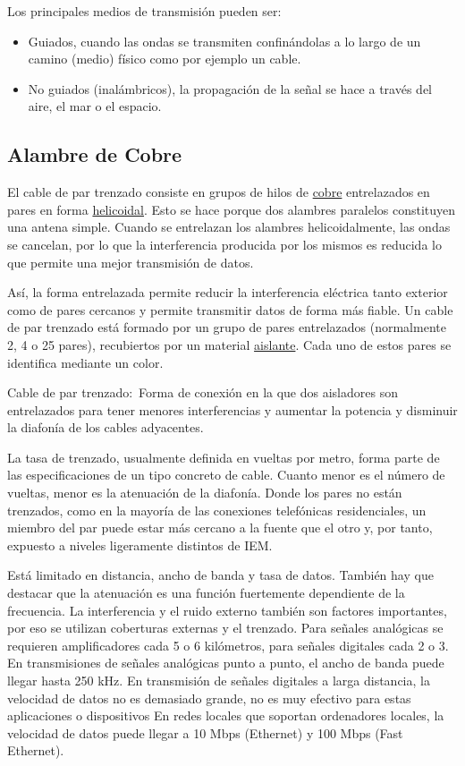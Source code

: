 \documentclass[a4paper]{article}
\begin{document}
Los principales medios de transmisión pueden ser:

\begin{itemize}
  \item Guiados, cuando las ondas se transmiten confinándolas a lo largo de un
  camino (medio) físico como por ejemplo un cable.
  
  \item No guiados (inalámbricos), la propagación de la señal se hace a través
  del aire, el mar o el espacio.  
\end{itemize}


\subsection{Alambre de Cobre}
El cable de par trenzado consiste en grupos de hilos
de \href{https://es.wikipedia.org/wiki/Cobre}{cobre} entrelazados en pares en forma \href{https://es.wikipedia.org/wiki/H\%C3\%A9lice_(geometr\%C3\%ADa)}{helicoidal}.
Esto se hace porque dos alambres paralelos constituyen una antena simple. Cuando se entrelazan los alambres helicoidalmente, las ondas se cancelan, por lo que la interferencia producida por los mismos es reducida lo que permite una mejor transmisión de datos.

Así, la forma entrelazada permite reducir la interferencia eléctrica
tanto exterior como de pares cercanos y permite transmitir datos de
forma más fiable. Un cable de par trenzado está formado por un grupo de
pares entrelazados (normalmente 2, 4 o 25 pares), recubiertos por un
material \href{https://es.wikipedia.org/wiki/Aislamiento_el\%C3\%A9ctrico}{aislante}.
Cada uno de estos pares se identifica mediante un color.

Cable de par trenzado:~Forma de conexión en la que dos aisladores son
entrelazados para tener menores interferencias y aumentar la potencia y
disminuir la diafonía de los cables adyacentes.

La tasa de trenzado, usualmente definida en vueltas por metro, forma
parte de las especificaciones de un tipo concreto de cable. Cuanto menor
es el número de vueltas, menor es la atenuación de la diafonía. Donde
los pares no están trenzados, como en la mayoría de las conexiones
telefónicas residenciales, un miembro del par puede estar más cercano a
la fuente que el otro y, por tanto, expuesto a niveles ligeramente
distintos de IEM.

Está limitado en distancia, ancho de banda y tasa de datos. También hay
que destacar que la atenuación es una función fuertemente dependiente de
la frecuencia. La interferencia y el ruido externo también son factores
importantes, por eso se utilizan coberturas externas y el trenzado. Para
señales analógicas se requieren amplificadores cada 5 o 6 kilómetros,
para señales digitales cada 2 o 3. En transmisiones de señales
analógicas punto a punto, el ancho de banda puede llegar hasta 250 kHz.
En transmisión de señales digitales a larga distancia, la velocidad de
datos no es demasiado grande, no es muy efectivo para estas aplicaciones
o dispositivos En redes locales que soportan ordenadores locales, la
velocidad de datos puede llegar a 10 Mbps (Ethernet) y 100 Mbps (Fast
Ethernet).
\end{document}
